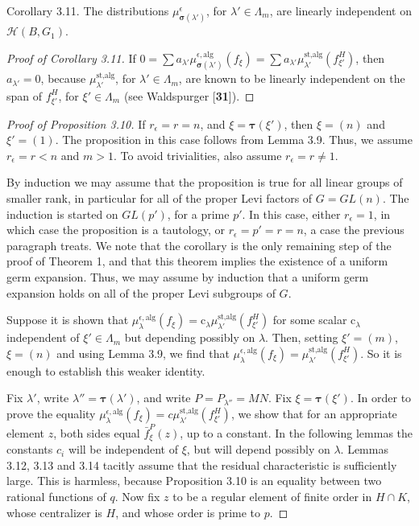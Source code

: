 \documentclass{amsart}
\begin{document}
\proclaim Corollary {3.11}.
The distributions 
  $ 
      \mu_{\pmb\sigma (\lambda')}^{\epsilon}
    $, for $\lambda'\in\Lambda_m$,
are linearly independent on
  $ {\mathcal H} (B, G_1) $.
\finishproclaim

\begin{proof}[Proof of Corollary 3.11]
If
  $ 0 = 
    \sum
    a_{\lambda'}
    \mu_{\pmb\sigma(\lambda')}^{\epsilon,\text{alg}}
    (f_{\xi}) =
    \sum
    a_{\lambda'}
    \mu_{\lambda'}^{\text{st,alg}}
    (f_{\xi'}^H) $,
then
  $ a_{\lambda'} = 0 $,
because 
  $ \mu_{\lambda'}^{\text{st,alg}} $,
  for $ \lambda' \in \Lambda_m $,
are known to be linearly independent on the span of
  $ f_{\xi'}^H $, for
  $ \xi' \in \Lambda_m $
(see Waldspurger [{\bf 31}]).
\end{proof}

\begin{proof}[Proof of Proposition 3.10]
If
  $ r_{\epsilon} = r = n $, and 
  $ \xi = \pmb\tau (\xi') $, then
  $ \xi = (n) $
and
  $ \xi' = (1) $.
The proposition in this case follows from
Lemma 3.9.
Thus, we assume 
  $ r_{\epsilon} = r < n $ and 
  $ m > 1 $.
To avoid trivialities, also assume
  $ r_{\epsilon} = r \neq 1 $.

By induction we may assume that the proposition is true for
  all linear groups of smaller rank, in particular for all of
  the proper Levi factors of 
  $ G = GL (n) $.
The induction is started on 
  $ GL(p') $, for 
a prime $p'$.  In this case, either
  $ r_{\epsilon} = 1 $,
in which case the proposition is a tautology, or
  $ r_{\epsilon} = p' = r = n $,
a case the previous paragraph treats.
We note that the corollary is the only remaining step of the
  proof of Theorem 1, and that this theorem implies the existence
  of a uniform germ expansion. 
Thus, we may assume by induction that a uniform germ expansion holds
  on all of the proper Levi subgroups of
  $G$.

Suppose it is shown that
  $ \mu_{\lambda}^{\epsilon,\text{alg}} (f_{\xi}) =
    \text{c}_{\lambda}
    \mu_{\lambda'}^{\text{st,alg}}
    (f_{\xi'}^H) $
for some scalar 
  $ \text{c}_{\lambda} $
independent of
  $ \xi' \in \Lambda_m $ but depending
  possibly on $\lambda$.
Then, setting
  $ \xi'= (m) $,
  $ \xi = (n) $
and using Lemma 3.9, we find that
  $ \mu_{\lambda}^{\epsilon,\text{alg}}
    (f_{\xi}) = 
    \mu_{\lambda'}^{\text{st,alg}} 
    (f_{\xi'}^H) $.
So it is enough to establish this weaker identity.

Fix $\lambda'$, write $\lambda''=\pmb\tau(\lambda')$, and
write $P=P_{\lambda''}=MN$.  Fix $\xi=\pmb\tau(\xi')$.  In order to
prove the equality $\mu_\lambda^{\epsilon,\text{alg}}(f_\xi) = c
\mu^{\text{st,alg}}_{\lambda'}(f^H_{\xi'})$, we show that for an
appropriate element $z$, both
sides equal $\bar f^P_\xi(z)$, up to a constant.
In the following
lemmas the constants $c_i$ will be independent of $\xi$, but
will depend possibly on $\lambda$.  Lemmas 3.12, 3.13 and 3.14 tacitly assume
that the residual characteristic is sufficiently large.  
This is harmless, because Proposition 3.10 is an equality between
two rational functions of $q$.  Now
fix $z$ to be a regular element of finite order in $H\cap K$, 
whose centralizer is $H$,
and whose order is prime to $p$.


\end{proof}
\end{document}

